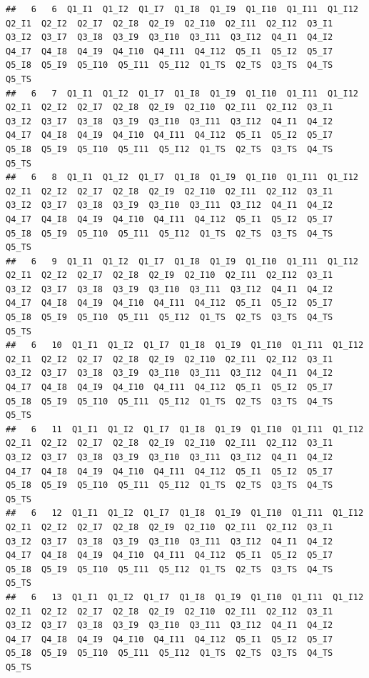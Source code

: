 \documentclass[]{book}
\begin{document}
\begin{verbatim}
##   6   6  Q1_I1  Q1_I2  Q1_I7  Q1_I8  Q1_I9  Q1_I10  Q1_I11  Q1_I12  Q2_I1  Q2_I2  Q2_I7  Q2_I8  Q2_I9  Q2_I10  Q2_I11  Q2_I12  Q3_I1  Q3_I2  Q3_I7  Q3_I8  Q3_I9  Q3_I10  Q3_I11  Q3_I12  Q4_I1  Q4_I2  Q4_I7  Q4_I8  Q4_I9  Q4_I10  Q4_I11  Q4_I12  Q5_I1  Q5_I2  Q5_I7  Q5_I8  Q5_I9  Q5_I10  Q5_I11  Q5_I12  Q1_TS  Q2_TS  Q3_TS  Q4_TS  Q5_TS
##   6   7  Q1_I1  Q1_I2  Q1_I7  Q1_I8  Q1_I9  Q1_I10  Q1_I11  Q1_I12  Q2_I1  Q2_I2  Q2_I7  Q2_I8  Q2_I9  Q2_I10  Q2_I11  Q2_I12  Q3_I1  Q3_I2  Q3_I7  Q3_I8  Q3_I9  Q3_I10  Q3_I11  Q3_I12  Q4_I1  Q4_I2  Q4_I7  Q4_I8  Q4_I9  Q4_I10  Q4_I11  Q4_I12  Q5_I1  Q5_I2  Q5_I7  Q5_I8  Q5_I9  Q5_I10  Q5_I11  Q5_I12  Q1_TS  Q2_TS  Q3_TS  Q4_TS  Q5_TS
##   6   8  Q1_I1  Q1_I2  Q1_I7  Q1_I8  Q1_I9  Q1_I10  Q1_I11  Q1_I12  Q2_I1  Q2_I2  Q2_I7  Q2_I8  Q2_I9  Q2_I10  Q2_I11  Q2_I12  Q3_I1  Q3_I2  Q3_I7  Q3_I8  Q3_I9  Q3_I10  Q3_I11  Q3_I12  Q4_I1  Q4_I2  Q4_I7  Q4_I8  Q4_I9  Q4_I10  Q4_I11  Q4_I12  Q5_I1  Q5_I2  Q5_I7  Q5_I8  Q5_I9  Q5_I10  Q5_I11  Q5_I12  Q1_TS  Q2_TS  Q3_TS  Q4_TS  Q5_TS
##   6   9  Q1_I1  Q1_I2  Q1_I7  Q1_I8  Q1_I9  Q1_I10  Q1_I11  Q1_I12  Q2_I1  Q2_I2  Q2_I7  Q2_I8  Q2_I9  Q2_I10  Q2_I11  Q2_I12  Q3_I1  Q3_I2  Q3_I7  Q3_I8  Q3_I9  Q3_I10  Q3_I11  Q3_I12  Q4_I1  Q4_I2  Q4_I7  Q4_I8  Q4_I9  Q4_I10  Q4_I11  Q4_I12  Q5_I1  Q5_I2  Q5_I7  Q5_I8  Q5_I9  Q5_I10  Q5_I11  Q5_I12  Q1_TS  Q2_TS  Q3_TS  Q4_TS  Q5_TS
##   6   10  Q1_I1  Q1_I2  Q1_I7  Q1_I8  Q1_I9  Q1_I10  Q1_I11  Q1_I12  Q2_I1  Q2_I2  Q2_I7  Q2_I8  Q2_I9  Q2_I10  Q2_I11  Q2_I12  Q3_I1  Q3_I2  Q3_I7  Q3_I8  Q3_I9  Q3_I10  Q3_I11  Q3_I12  Q4_I1  Q4_I2  Q4_I7  Q4_I8  Q4_I9  Q4_I10  Q4_I11  Q4_I12  Q5_I1  Q5_I2  Q5_I7  Q5_I8  Q5_I9  Q5_I10  Q5_I11  Q5_I12  Q1_TS  Q2_TS  Q3_TS  Q4_TS  Q5_TS
##   6   11  Q1_I1  Q1_I2  Q1_I7  Q1_I8  Q1_I9  Q1_I10  Q1_I11  Q1_I12  Q2_I1  Q2_I2  Q2_I7  Q2_I8  Q2_I9  Q2_I10  Q2_I11  Q2_I12  Q3_I1  Q3_I2  Q3_I7  Q3_I8  Q3_I9  Q3_I10  Q3_I11  Q3_I12  Q4_I1  Q4_I2  Q4_I7  Q4_I8  Q4_I9  Q4_I10  Q4_I11  Q4_I12  Q5_I1  Q5_I2  Q5_I7  Q5_I8  Q5_I9  Q5_I10  Q5_I11  Q5_I12  Q1_TS  Q2_TS  Q3_TS  Q4_TS  Q5_TS
##   6   12  Q1_I1  Q1_I2  Q1_I7  Q1_I8  Q1_I9  Q1_I10  Q1_I11  Q1_I12  Q2_I1  Q2_I2  Q2_I7  Q2_I8  Q2_I9  Q2_I10  Q2_I11  Q2_I12  Q3_I1  Q3_I2  Q3_I7  Q3_I8  Q3_I9  Q3_I10  Q3_I11  Q3_I12  Q4_I1  Q4_I2  Q4_I7  Q4_I8  Q4_I9  Q4_I10  Q4_I11  Q4_I12  Q5_I1  Q5_I2  Q5_I7  Q5_I8  Q5_I9  Q5_I10  Q5_I11  Q5_I12  Q1_TS  Q2_TS  Q3_TS  Q4_TS  Q5_TS
##   6   13  Q1_I1  Q1_I2  Q1_I7  Q1_I8  Q1_I9  Q1_I10  Q1_I11  Q1_I12  Q2_I1  Q2_I2  Q2_I7  Q2_I8  Q2_I9  Q2_I10  Q2_I11  Q2_I12  Q3_I1  Q3_I2  Q3_I7  Q3_I8  Q3_I9  Q3_I10  Q3_I11  Q3_I12  Q4_I1  Q4_I2  Q4_I7  Q4_I8  Q4_I9  Q4_I10  Q4_I11  Q4_I12  Q5_I1  Q5_I2  Q5_I7  Q5_I8  Q5_I9  Q5_I10  Q5_I11  Q5_I12  Q1_TS  Q2_TS  Q3_TS  Q4_TS  Q5_TS

\end{verbatim}
\end{document}
